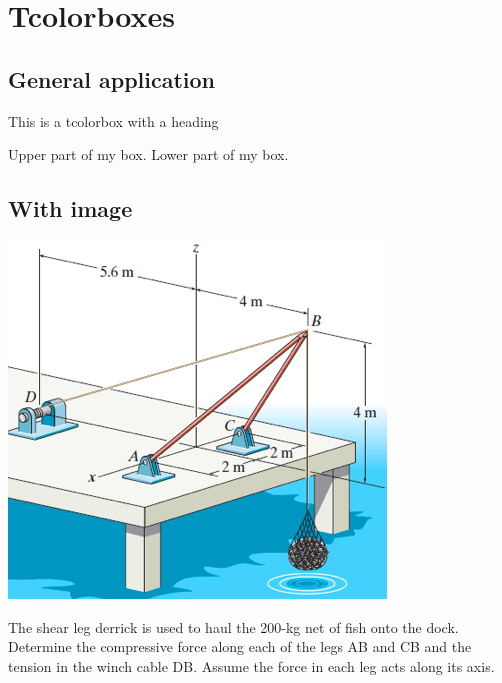 \section{Tcolorboxes}

\subsection{General application}
\begin{tcolorbox}[colback=red!5!white,colframe=red!50!black,title=My nice heading]
    This is a tcolorbox with a heading
\end{tcolorbox}

\begin{tcolorbox}[colback=green!5!white,colframe=green!75!black]
    Upper part of my box.
    \tcblower
    Lower part of my box.
\end{tcolorbox}

\subsection{With image}
\begin{tcolorbox}[title=Statics Problem Example, colback=white!95!black,colframe=black!70!white,colbacktitle=black!10!white, coltitle=black, fonttitle=\bfseries, coltext=black]
    \begin{center}
        \includegraphics[width=0.5\linewidth]{photos/statics_problem.png}
    \end{center}
    The shear leg derrick is used to haul the 200-kg net of fish onto the dock. Determine the compressive force along each of the legs AB and CB and the tension in the winch cable DB. Assume the force in each leg acts along its axis.
\end{tcolorbox}